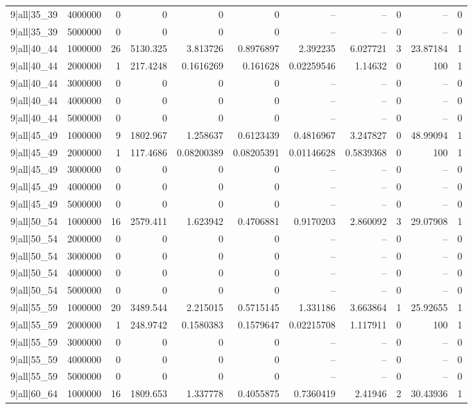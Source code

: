 \begin{tabular}{lrrrrrrrrrr}
9|all|35\_39 & 4000000 & 0 & 0 & 0 & 0 & -- & -- & 0 & -- & 0 \\
9|all|35\_39 & 5000000 & 0 & 0 & 0 & 0 & -- & -- & 0 & -- & 0 \\
9|all|40\_44 & 1000000 & 26 & 5130.325 & 3.813726 & 0.8976897 & 2.392235 & 6.027721 & 3 & 23.87184 & 1 \\
9|all|40\_44 & 2000000 & 1 & 217.4248 & 0.1616269 & 0.161628 & 0.02259546 & 1.14632 & 0 & 100 & 1 \\
9|all|40\_44 & 3000000 & 0 & 0 & 0 & 0 & -- & -- & 0 & -- & 0 \\
9|all|40\_44 & 4000000 & 0 & 0 & 0 & 0 & -- & -- & 0 & -- & 0 \\
9|all|40\_44 & 5000000 & 0 & 0 & 0 & 0 & -- & -- & 0 & -- & 0 \\
9|all|45\_49 & 1000000 & 9 & 1802.967 & 1.258637 & 0.6123439 & 0.4816967 & 3.247827 & 0 & 48.99094 & 1 \\
9|all|45\_49 & 2000000 & 1 & 117.4686 & 0.08200389 & 0.08205391 & 0.01146628 & 0.5839368 & 0 & 100 & 1 \\
9|all|45\_49 & 3000000 & 0 & 0 & 0 & 0 & -- & -- & 0 & -- & 0 \\
9|all|45\_49 & 4000000 & 0 & 0 & 0 & 0 & -- & -- & 0 & -- & 0 \\
9|all|45\_49 & 5000000 & 0 & 0 & 0 & 0 & -- & -- & 0 & -- & 0 \\
9|all|50\_54 & 1000000 & 16 & 2579.411 & 1.623942 & 0.4706881 & 0.9170203 & 2.860092 & 3 & 29.07908 & 1 \\
9|all|50\_54 & 2000000 & 0 & 0 & 0 & 0 & -- & -- & 0 & -- & 0 \\
9|all|50\_54 & 3000000 & 0 & 0 & 0 & 0 & -- & -- & 0 & -- & 0 \\
9|all|50\_54 & 4000000 & 0 & 0 & 0 & 0 & -- & -- & 0 & -- & 0 \\
9|all|50\_54 & 5000000 & 0 & 0 & 0 & 0 & -- & -- & 0 & -- & 0 \\
9|all|55\_59 & 1000000 & 20 & 3489.544 & 2.215015 & 0.5715145 & 1.331186 & 3.663864 & 1 & 25.92655 & 1 \\
9|all|55\_59 & 2000000 & 1 & 248.9742 & 0.1580383 & 0.1579647 & 0.02215708 & 1.117911 & 0 & 100 & 1 \\
9|all|55\_59 & 3000000 & 0 & 0 & 0 & 0 & -- & -- & 0 & -- & 0 \\
9|all|55\_59 & 4000000 & 0 & 0 & 0 & 0 & -- & -- & 0 & -- & 0 \\
9|all|55\_59 & 5000000 & 0 & 0 & 0 & 0 & -- & -- & 0 & -- & 0 \\
9|all|60\_64 & 1000000 & 16 & 1809.653 & 1.337778 & 0.4055875 & 0.7360419 & 2.41946 & 2 & 30.43936 & 1 \\

\end{tabular}
